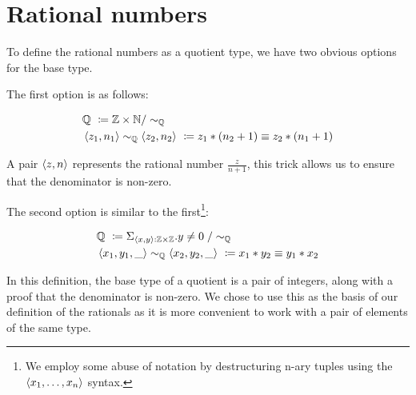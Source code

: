 \documentclass[12pt,twoside,maitrise]{dms}
\theoremstyle{definition}
\numberwithin{equation}{section}
\numberwithin{table}{chapter}
\numberwithin{figure}{chapter}
\begin{document}
\section{Rational numbers}
To define the rational numbers as a quotient type, we have two obvious options for the base type.

The first option is as follows:

\begin{align*}
  & \mathbb{Q} \ \coloneqq \mathbb{Z} \times \mathbb{N} / \sim_{\mathbb{Q}} \\
  & \braket{z_1 , n_1} \sim_{\mathbb{Q}} \braket{z_2 , n_2} \ \coloneqq z_1 * (n_2 + 1) \equiv z_2 * (n_1 + 1)
\end{align*}

A pair $\braket{z , n}$ represents the rational number $\frac{z}{n + 1}$, this
trick allows us to ensure that the denominator is non-zero.

The second option is similar to the first\footnote{We employ some abuse of
notation by destructuring n-ary tuples using the $\braket{x_1, \ldots,
  x_n}$ syntax.}:

\begin{align*}
  & \mathbb{Q} \ \coloneqq \Sigma_{\oftype{\braket{x, y}}{\mathbb{Z} \times \mathbb{Z}}} . y \ne 0\; / \sim_{\mathbb{Q}} \\
  & \braket{x_1 , y_1, \_} \sim_{\mathbb{Q}} \braket{x_2 , y_2, \_} \ \coloneqq x_1 * y_2 \equiv y_1 * x_2
\end{align*}

In this definition, the base type of a quotient is a pair of integers, along
with a proof that the denominator is non-zero. We chose to use this as the basis
of our definition of the rationals as it is more convenient to work with a pair
of elements of the same type.
\end{document}
